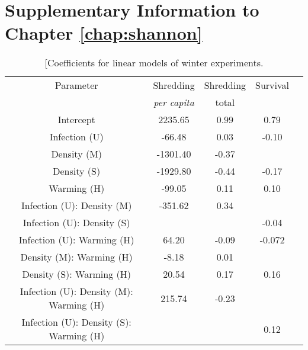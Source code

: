 \chapter{Supplementary Information to Chapter \ref{chap:shannon}}%
\label{chap:Appendix C}

\begin{table}
\caption [Coefficients for linear models of winter experiments.]{[Coefficients for linear models of winter experiments.}
\centering
\begin{tabular}{ccccl}\toprule
Parameter                               & Shredding           & Shredding & Survival &  \\
                                        & \textit{per capita} & total     &          &  \\\midrule
Intercept                               & 2235.65             & 0.99      & 0.79     &  \\ 
Infection (U)                           & -66.48              & 0.03      & -0.10    &  \\
Density (M)                             & -1301.40            & -0.37     &          &  \\
Density (S)                             & -1929.80            & -0.44     & -0.17    &  \\
Warming (H)                             & -99.05              & 0.11      & 0.10     &  \\
Infection (U): Density (M)              & -351.62             & 0.34      &          &  \\
Infection (U): Density (S)              &                     &           & -0.04    &  \\
Infection (U): Warming (H)              & 64.20               & -0.09     & -0.072   &  \\
Density (M): Warming (H)                & -8.18               & 0.01      &          &  \\
Density (S): Warming (H)                & 20.54               & 0.17      & 0.16     &  \\
Infection (U): Density (M): Warming (H) & 215.74              & -0.23     &          &  \\
Infection (U): Density (S): Warming (H) &                     &           & 0.12     & \\ \bottomrule
\end{tabular}
\end{table}



